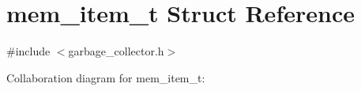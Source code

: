 \hypertarget{structmem__item__t}{}\section{mem\+\_\+item\+\_\+t Struct Reference}
\label{structmem__item__t}


{\ttfamily \#include $<$garbage\+\_\+collector.\+h$>$}



Collaboration diagram for mem\+\_\+item\+\_\+t\+:
